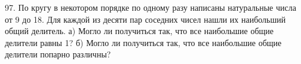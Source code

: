97. По кругу в некотором порядке по одному разу написаны натуральные числа от 9 до 18. Для каждой из десяти пар соседних чисел нашли их наибольший общий делитель. а) Могло ли получиться так, что все наибольшие общие делители равны 1? б) Могло ли получиться так, что все наибольшие общие делители попарно различны?\\

